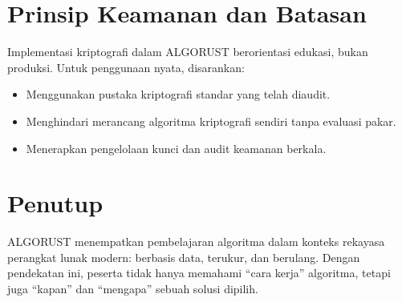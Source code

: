 \documentclass{article}
\begin{document}
\section{Prinsip Keamanan dan Batasan}
Implementasi kriptografi dalam ALGORUST berorientasi edukasi, bukan produksi.
Untuk penggunaan nyata, disarankan:
\begin{itemize}
  \item Menggunakan pustaka kriptografi standar yang telah diaudit.
  \item Menghindari merancang algoritma kriptografi sendiri tanpa evaluasi pakar.
  \item Menerapkan pengelolaan kunci dan audit keamanan berkala.
\end{itemize}

\section{Penutup}
ALGORUST menempatkan pembelajaran algoritma dalam konteks rekayasa perangkat lunak modern:
berbasis data, terukur, dan berulang. Dengan pendekatan ini, peserta tidak hanya memahami
``cara kerja'' algoritma, tetapi juga ``kapan'' dan ``mengapa'' sebuah solusi dipilih.
\end{document}
